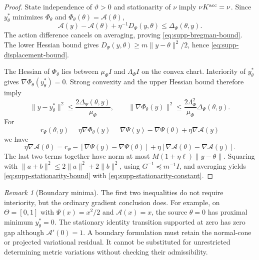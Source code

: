 \documentclass[11pt]{article}
\theoremstyle{definition}
\theoremstyle{remark}
\newtheorem{remark}[remark]{Remark}
\begin{document}
\begin{proof}
State independence of $\vartheta>0$ and stationarity of $\nu$ imply
$\nu K^{\rm acc}=\nu$.  Since $y_\theta^*$ minimizes $\Phi_\theta$ and
$\Phi_\theta(\theta)=\mathcal A(\theta)$,
\[
 \mathcal A(y)-\mathcal A(\theta)+\eta^{-1}D_\Psi(y,\theta)
       \le\Delta_\Psi(\theta,y).
\]
The action difference cancels on averaging, proving
\eqref{eq:supp-bregman-bound}.  The lower Hessian bound gives
$D_\Psi(y,\theta)\ge m\|y-\theta\|^2/2$, hence
\eqref{eq:supp-displacement-bound}.

The Hessian of $\Phi_\theta$ lies between $\mu_\Phi I$ and
$\Lambda_\Phi I$ on the convex chart.  Interiority of $y_\theta^*$ gives
$\nabla\Phi_\theta(y_\theta^*)=0$.  Strong convexity and the upper Hessian
bound therefore imply
\[
 \|y-y_\theta^*\|^2\le\frac{2\Delta_\Psi(\theta,y)}{\mu_\Phi},
 \qquad
 \|\nabla\Phi_\theta(y)\|^2
       \le\frac{2\Lambda_\Phi^2}{\mu_\Phi}\Delta_\Psi(\theta,y).
\]
For
\[
 r_\Psi(\theta,y)=\eta\nabla\Phi_\theta(y)
       =\nabla\Psi(y)-\nabla\Psi(\theta)+\eta\nabla\mathcal A(y)
\]
we have
\[
 \eta\nabla\mathcal A(\theta)
 =r_\Psi-[\nabla\Psi(y)-\nabla\Psi(\theta)]
       +\eta[\nabla\mathcal A(\theta)-\nabla\mathcal A(y)].
\]
The last two terms together have norm at most
$M(1+\eta\ell)\|y-\theta\|$.  Squaring with
$\|a+b\|^2\le2\|a\|^2+2\|b\|^2$, using $G^{-1}\preceq m^{-1}I$, and
averaging yields \eqref{eq:supp-stationarity-bound} with
\eqref{eq:supp-stationarity-constant}.
\end{proof}

\begin{remark}[Boundary minima]
The first two inequalities do not require interiority, but the ordinary
gradient conclusion does.  For example, on $\Theta=[0,1]$ with
$\Psi(x)=x^2/2$ and $\mathcal A(x)=x$, the source $\theta=0$ has proximal
minimum $y_\theta^*=0$.  The stationary identity transition supported at zero
has zero gap although $\mathcal A'(0)=1$.  A boundary formulation must retain
the normal-cone or projected variational residual.  It cannot be substituted
for unrestricted determining metric variations without checking their
admissibility.
\end{remark}
\end{document}
